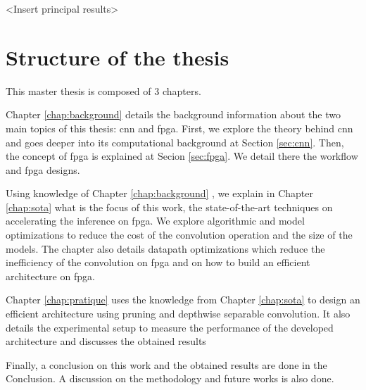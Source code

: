 <Insert principal results>
%
%
\section*{Structure of the thesis}
%
%
This master thesis is composed of 3 chapters.

Chapter \ref{chap:background} details the background information about the two main topics of this thesis: \acrshort{cnn} and \acrshort{fpga}. First, we explore the theory behind \acrshort{cnn} and goes deeper into its computational background at Section \ref{sec:cnn}. Then, the concept of \acrshort{fpga} is explained at Secion \ref{sec:fpga}. We detail there the workflow and \acrshort{fpga} designs.

Using knowledge of Chapter \ref{chap:background} , we explain in Chapter \ref{chap:sota} what is the focus of this work, the state-of-the-art techniques on accelerating the inference on \acrshort{fpga}. We explore algorithmic and model optimizations to reduce the cost of the convolution operation and the size of the models. The chapter also details datapath optimizations which reduce the inefficiency of the convolution on \acrshort{fpga} and on how to build an efficient architecture on \acrshort{fpga}.

Chapter \ref{chap:pratique} uses the knowledge from Chapter \ref{chap:sota} to design an efficient architecture using pruning and depthwise separable convolution. It also details the experimental setup to measure the performance of the developed architecture and discusses the obtained results

Finally, a conclusion on this work and the obtained results are done in the Conclusion. A discussion on the methodology and future works is also done.

\afterpage{\blankpage}
\cleardoublepage
\newpage
